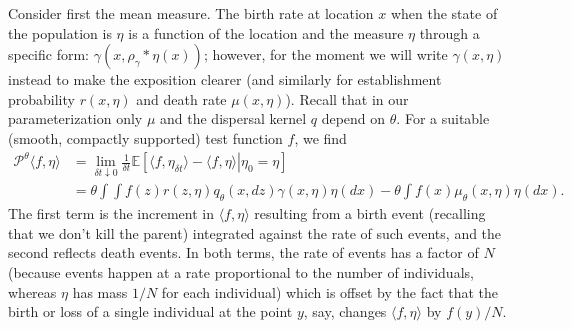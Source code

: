 \documentclass[12pt]{article}
\newcommand{\IE}{\mathbb E}
\newcommand{\kernel}{\rho}  %
\newcommand{\smooth}[1]{\kernel_{#1} \! * \!}  %
\newcommand{\Pgen}{\mathcal{P}}    %
\begin{document}
Consider first the mean measure.
The birth rate at location $x$ when the state of the population is $\eta$
is a function of the location and the measure $\eta$ through a specific form:
$\gamma(x, \smooth{\gamma} \eta(x))$;
however, for the moment we will write $\gamma(x, \eta)$ instead
to make the exposition clearer
(and similarly for establishment probability $r(x, \eta)$ and death rate $\mu(x, \eta)$).
Recall that in our parameterization only $\mu$ and the dispersal kernel $q$ depend on $\theta$.
For a suitable (smooth, compactly supported) test function $f$, we find
\begin{equation} \label{mean measure}
    \begin{split}
    \Pgen^\theta \langle f, \eta \rangle
    &=
    \lim_{\delta t\downarrow 0} \frac{1}{\delta t}
    \IE\left[ \left.
        \langle f, \eta_{\delta t} \rangle
        -
        \langle f, \eta\rangle
        \right| \eta_0 = \eta
    \right]
    \\
    &=
    \theta \int
        \int f(z) r(z,\eta) q_\theta(x,dz)
    \gamma(x, \eta) \eta(dx)
    -
    \theta \int f(x)\mu_\theta(x, \eta)
    \eta(dx).
    \end{split}
\end{equation}
The first term is the increment in $\langle f,\eta\rangle$
resulting from a birth event (recalling that
we don't kill the parent) integrated against the rate of such events,
and the second reflects death events.
In both terms,
the rate of events has a factor of $N$ (because events happen at a rate 
proportional to the number of individuals,
whereas $\eta$ has mass $1/N$ for each individual)
which is offset by the fact that  
the birth or loss of a single 
individual at the point $y$, say, changes $\langle f,\eta\rangle$
by $f(y)/N$.
\end{document}
